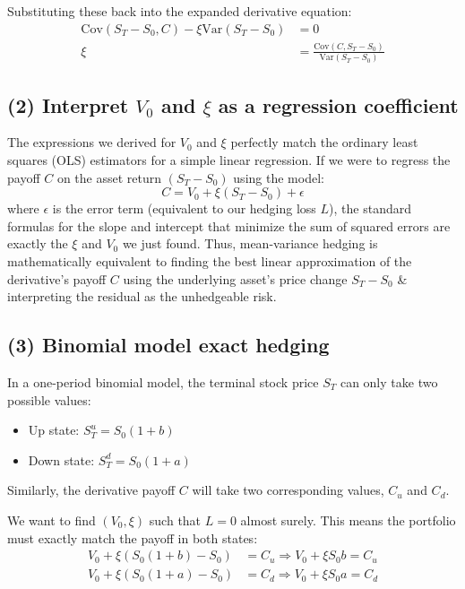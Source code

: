 Substituting these back into the expanded derivative equation:
\begin{align*}
\text{Cov}(S_T - S_0, C) - \xi\text{Var}(S_T - S_0) &= 0 \\
\xi &= \frac{\text{Cov}(C, S_T - S_0)}{\text{Var}(S_T - S_0)}
\end{align*}


\subsection*{(2) Interpret $V_0$ and $\xi$ as a regression coefficient}

The expressions we derived for $V_0$ and $\xi$ perfectly match the ordinary least squares (OLS) estimators for a simple linear regression. 
If we were to regress the payoff $C$ on the asset return $(S_T - S_0)$ using the model:
\begin{equation*}
C = V_0 + \xi(S_T - S_0) + \epsilon
\end{equation*}
where $\epsilon$ is the error term (equivalent to our hedging loss $L$), the standard formulas for the slope and intercept that minimize the sum of squared errors are exactly the $\xi$ and $V_0$ we just found. 
Thus, mean-variance hedging is mathematically equivalent to finding the best linear approximation of the derivative's payoff $C$ using the underlying asset's price change $S_T - S_0$ \& interpreting the residual as the unhedgeable risk.


\subsection*{(3) Binomial model exact hedging}

In a one-period binomial model, the terminal stock price $S_T$ can only take two possible values:
\begin{itemize}
    \item Up state: $S_T^u = S_0(1+b)$
    \item Down state: $S_T^d = S_0(1+a)$
\end{itemize}
Similarly, the derivative payoff $C$ will take two corresponding values, $C_u$ and $C_d$.

We want to find $(V_0, \xi)$ such that $L = 0$ almost surely. This means the portfolio must exactly match the payoff in both states:
\begin{align}
V_0 + \xi(S_0(1+b) - S_0) &= C_u \Rightarrow V_0 + \xi S_0 b = C_u \\
V_0 + \xi(S_0(1+a) - S_0) &= C_d \Rightarrow V_0 + \xi S_0 a = C_d
\end{align}

